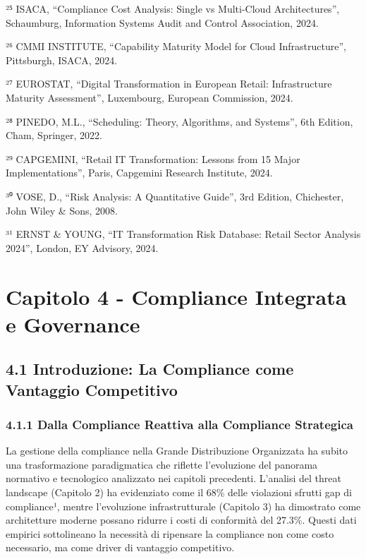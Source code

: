 \documentclass{report}
\begin{document}
²⁵ ISACA, ``Compliance Cost Analysis: Single vs Multi-Cloud
Architectures'', Schaumburg, Information Systems Audit and Control
Association, 2024.

²⁶ CMMI INSTITUTE, ``Capability Maturity Model for Cloud
Infrastructure'', Pittsburgh, ISACA, 2024.

²⁷ EUROSTAT, ``Digital Transformation in European Retail: Infrastructure
Maturity Assessment'', Luxembourg, European Commission, 2024.

²⁸ PINEDO, M.L., ``Scheduling: Theory, Algorithms, and Systems'', 6th
Edition, Cham, Springer, 2022.

²⁹ CAPGEMINI, ``Retail IT Transformation: Lessons from 15 Major
Implementations'', Paris, Capgemini Research Institute, 2024.

³⁰ VOSE, D., ``Risk Analysis: A Quantitative Guide'', 3rd Edition,
Chichester, John Wiley \& Sons, 2008.

³¹ ERNST \& YOUNG, ``IT Transformation Risk Database: Retail Sector
Analysis 2024'', London, EY Advisory, 2024.

\section{Capitolo 4 - Compliance Integrata e
Governance}\label{capitolo-4---compliance-integrata-e-governance}

\subsection{4.1 Introduzione: La Compliance come Vantaggio
Competitivo}\label{introduzione-la-compliance-come-vantaggio-competitivo}

\subsubsection{4.1.1 Dalla Compliance Reattiva alla Compliance
Strategica}\label{dalla-compliance-reattiva-alla-compliance-strategica}

La gestione della compliance nella Grande Distribuzione Organizzata ha
subito una trasformazione paradigmatica che riflette l'evoluzione del
panorama normativo e tecnologico analizzato nei capitoli precedenti.
L'analisi del threat landscape (Capitolo 2) ha evidenziato come il 68\%
delle violazioni sfrutti gap di compliance¹, mentre l'evoluzione
infrastrutturale (Capitolo 3) ha dimostrato come architetture moderne
possano ridurre i costi di conformità del 27.3\%. Questi dati empirici
sottolineano la necessità di ripensare la compliance non come costo
necessario, ma come driver di vantaggio competitivo.
\end{document}
